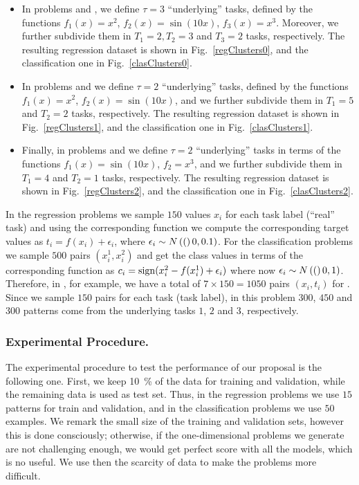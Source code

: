 \begin{itemize}
    \item In problems  and , we define $\tau=3$ ``underlying'' tasks, defined by the functions $f_1(x) = x^2$,  $f_2(x) = \sin(10x)$, $f_3(x) = x^3$. Moreover, we further subdivide them in $T_1 = 2, T_2 = 3$ and $T_3 = 2$ tasks, respectively. The resulting regression dataset is shown in Fig.~\ref{regClusters0}, and the classification one in Fig.~\ref{clasClusters0}. 
    \item In problems  and  we define $\tau=2$ ``underlying'' tasks, defined by the functions $f_1(x) = x^2$,  $f_2(x) = \sin(10x)$, and we further subdivide them in
    $T_1 = 5$ and $T_2 = 2$ tasks, respectively. The resulting regression dataset is shown in Fig.~\ref{regClusters1}, and the classification one in Fig.~\ref{clasClusters1}. 
    \item Finally, in problems  and  we define $\tau=2$ ``underlying'' tasks in terms of the functions $f_1(x) = \sin(10x)$, $f_2 = x^3$, and we further subdivide them in
    $T_1 = 4$ and $T_2 = 1$ tasks, respectively. The resulting regression dataset is shown in Fig.~\ref{regClusters2}, and the classification one in Fig.~\ref{clasClusters2}.
\end{itemize}
%
In the regression problems we sample $150$ values $x_i$ for each task label (``real'' task) and using the corresponding function we compute the corresponding target values as $t_i = f(x_i) + \epsilon_i$, where $\epsilon_i \sim N \left((\right)0, 0.1)$.
For the classification problems we sample $500$ pairs $(x_i^1, x_i^2)$ and get the class values in terms of the corresponding function as $c_i = \operatorname{sign}(x_i^2 - f(x_i^1) + \epsilon_i)$ where now $\epsilon_i \sim N \left((\right)0, 1)$.
%
Therefore, in , for example, we have a total of $7 \times 150 = \num{1050}$ pairs $(x_i, t_i)$ for . Since we sample $150$ pairs for each task (task label), in this problem $300$, $450$ and $300$ patterns come from the underlying tasks $1$, $2$ and $3$, respectively.

\subsubsection*{Experimental Procedure.}
The experimental procedure to test the performance of our proposal is the following one.
First, we keep \SI{10}{\percent} of the data for training and validation, while the remaining data is used as test set. Thus, in the regression problems we use $15$ patterns for train and validation, and in the classification problems we use $50$ examples.
%
We remark the small size of the training and validation sets, however this is done consciously; otherwise, if the one-dimensional problems we generate are not challenging enough, we would get perfect score with all the models, which is no useful. We use then the scarcity of data to make the problems more difficult.
%

